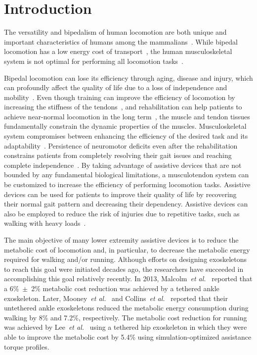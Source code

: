 \documentclass[10pt,letterpaper]{article}
\newcommand{\etal}{\textit{et al.}}
\begin{document}
\bigskip
\section*{Introduction}
The versatility and bipedalism of human locomotion are both unique and important characteristics of humans among the mammalians~\cite{Rodman1980}. While bipedal locomotion has a low energy cost of transport~\cite{Rodman1980}, the human musculoskeletal system is not optimal for performing all locomotion tasks~\cite{Uchida2016_idealexo_running}.

Bipedal locomotion can lose its efficiency through aging, disease and injury, which can profoundly affect the quality of life due to a loss of independence and mobility~\cite{Schalock2004}. Even though training can improve the efficiency of locomotion by increasing the stiffness of the tendons~\cite{Kubo2002}, and rehabilitation can help patients to achieve near-normal locomotion  in the long term~\cite{Duncan2011}, the muscle and tendon tissues fundamentally constrain the dynamic properties of the muscles. Musculoskeletal system compromises between enhancing the efficiency of the desired task and its adaptability~\cite{Uchida2016_idealexo_running}. Persistence of neuromotor deficits even after the rehabilitation constrains patients from completely resolving their gait issues and reaching complete independence~\cite{Duncan2011}. By taking advantage of assistive devices that are not bounded by any fundamental biological limitations, a musculotendon system can be customized to increase the efficiency of performing locomotion tasks. Assistive devices can be used for patients to improve their quality of life by recovering their normal gait pattern and decreasing their dependency. Assistive devices can also be employed to reduce the risk of injuries due to repetitive tasks, such as walking with heavy loads~\cite{Ruby2003,Knapik2004}.

The main objective of many lower extremity assistive devices is  to reduce the metabolic cost of locomotion and, in particular, to decrease the metabolic energy required for walking and/or running. Although efforts on designing exoskeletons to reach this goal were initiated decades ago, the researchers have succeeded in accomplishing this goal relatively recently. In 2013, Malcolm~\etal~\cite{Malcolm2013} reported that a 6\%~$\pm$~2\% metabolic cost reduction was achieved by a tethered ankle exoskeleton. Later, Mooney~\etal~\cite{Mooney2014_a} and Collins~\etal~\cite{Collins2015} reported that  their untethered ankle exoskeletons reduced the metabolic energy consumption during walking by 8\% and 7.2\%, respectively. The metabolic cost reduction for running was achieved by Lee~\etal~\cite{Lee2017_softexo_running} using a tethered hip exoskeleton in which they were able to improve the metabolic cost by 5.4\% using simulation-optimized assistance torque profiles.
\end{document}
